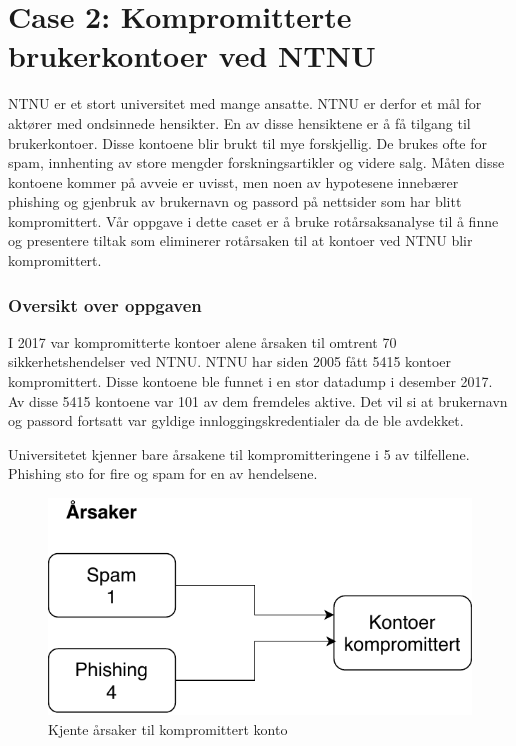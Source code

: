 \section{Case 2: Kompromitterte brukerkontoer ved NTNU}
\label{sec:case_kontoer}
NTNU er et stort universitet med mange ansatte. NTNU er derfor et mål for aktører med ondsinnede hensikter. En av disse hensiktene er å få tilgang til brukerkontoer. Disse kontoene blir brukt til mye forskjellig. De brukes ofte for spam, innhenting av store mengder forskningsartikler og videre salg. Måten disse kontoene kommer på avveie er uvisst, men noen av hypotesene innebærer phishing og gjenbruk av brukernavn og passord på nettsider som har blitt kompromittert. Vår oppgave i dette caset er å bruke rotårsaksanalyse til å finne og presentere tiltak som eliminerer rotårsaken til at kontoer ved NTNU blir kompromittert.

\subsubsection{Oversikt over oppgaven}
I 2017 var kompromitterte kontoer alene årsaken til omtrent 70 sikkerhetshendelser ved NTNU. NTNU har siden 2005 fått 5415 kontoer kompromittert. Disse kontoene ble funnet i en stor datadump i desember 2017. Av disse 5415 kontoene var 101 av dem fremdeles aktive. Det vil si at brukernavn og passord fortsatt var gyldige innloggingskredentialer da de ble avdekket. 

Universitetet kjenner bare årsakene til kompromitteringene i 5 av tilfellene. Phishing sto for fire og spam for en av hendelsene. 

\begin{figure}[H]
    \centering
    \includegraphics[scale=0.6]{case_2/bilder/kjente_arsaker.pdf}
    \caption[Kjente årsaker til kompromittert konto]{Kjente årsaker til kompromittert konto}
    \label{fig:kjente-arsaker-kompromittert-konto}
\end{figure}

